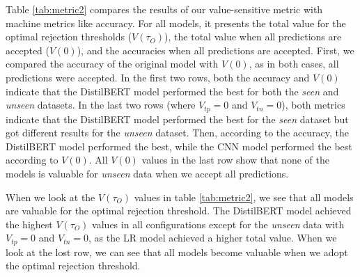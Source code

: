 %
Table \ref{tab:metric2} compares the results of our value-sensitive metric with machine metrics like accuracy.
%
For all models, it presents the total value for the optimal rejection thresholds ($V(\tau_O)$), the total value when all predictions are accepted ($V(0)$), and the accuracies when all predictions are accepted.
%
First, we compared the accuracy of the original model with $V(0)$, as in both cases, all predictions were accepted.
%
In the first two rows, both the accuracy and $V(0)$ indicate that the DistilBERT model performed the best for both the \emph{seen} and \emph{unseen} datasets.
%
In the last two rows (where $V_{tp}=0$ and $V_{tn}=0$), both metrics indicate that the DistilBERT model performed the best for the \emph{seen} dataset but got different results for the \emph{unseen} dataset.
%
Then, according to the accuracy, the DistilBERT model performed the best, while the CNN model performed the best according to $V(0)$.
%
All $V(0)$ values in the last row show that none of the models is valuable for \emph{unseen} data when we accept all predictions.
%

%
When we look at the $V(\tau_O)$ values in table \ref{tab:metric2}, we see that all models are valuable for the optimal rejection threshold.
%
The DistilBERT model achieved the highest $V(\tau_O)$ values in all configurations except for the \emph{unseen} data with $V_{tp}=0$ and $V_{tn}=0$, as the LR model achieved a higher total value.
%
When we look at the lost row, we can see that all models become valuable when we adopt the optimal rejection threshold.

